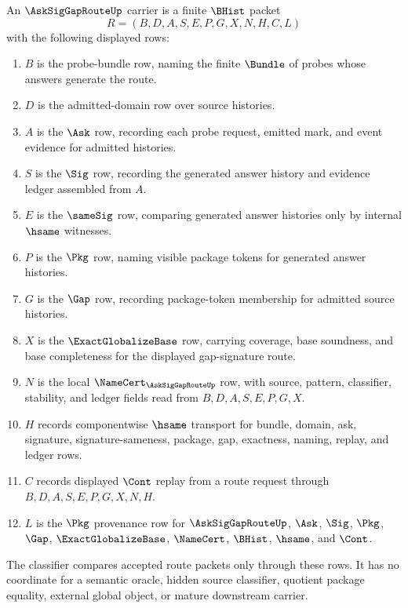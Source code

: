 \begin{definition}
\label{def:ask-sig-gap-route-carrier}
An $\AskSigGapRouteUp$ carrier is a finite $\BHist$ packet
$$
R=(B,D,A,S,E,P,G,X,N,H,C,L)
$$
with the following displayed rows:
\begin{enumerate}
\item $B$ is the probe-bundle row, naming the finite $\Bundle$ of probes whose answers generate the route.
\item $D$ is the admitted-domain row over source histories.
\item $A$ is the $\Ask$ row, recording each probe request, emitted mark, and event evidence for admitted histories.
\item $S$ is the $\Sig$ row, recording the generated answer history and evidence ledger assembled from $A$.
\item $E$ is the $\sameSig$ row, comparing generated answer histories only by internal $\hsame$ witnesses.
\item $P$ is the $\Pkg$ row, naming visible package tokens for generated answer histories.
\item $G$ is the $\Gap$ row, recording package-token membership for admitted source histories.
\item $X$ is the $\ExactGlobalizeBase$ row, carrying coverage, base soundness, and base completeness for the displayed gap-signature route.
\item $N$ is the local $\NameCert_{\AskSigGapRouteUp}$ row, with source, pattern, classifier, stability, and ledger fields read from $B,D,A,S,E,P,G,X$.
\item $H$ records componentwise $\hsame$ transport for bundle, domain, ask, signature, signature-sameness, package, gap, exactness, naming, replay, and ledger rows.
\item $C$ records displayed $\Cont$ replay from a route request through $B,D,A,S,E,P,G,X,N,H$.
\item $L$ is the $\Pkg$ provenance row for $\AskSigGapRouteUp$, $\Ask$, $\Sig$, $\Pkg$, $\Gap$, $\ExactGlobalizeBase$, $\NameCert$, $\BHist$, $\hsame$, and $\Cont$.
\end{enumerate}
The classifier compares accepted route packets only through these rows. It has no coordinate for a semantic oracle, hidden source classifier, quotient package equality, external global object, or mature downstream carrier.
\end{definition}

